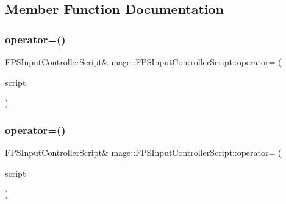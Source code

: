 \subsection{Member Function Documentation}
\hypertarget{classmage_1_1_f_p_s_input_controller_script_a226a1fb2eecbd7ecdf2033a8f5460e8b}{}\label{classmage_1_1_f_p_s_input_controller_script_a226a1fb2eecbd7ecdf2033a8f5460e8b} 
\subsubsection{\texorpdfstring{operator=()}{operator=()}\hspace{0.1cm}{\footnotesize\ttfamily [1/2]}}
{\footnotesize\ttfamily \hyperlink{classmage_1_1_f_p_s_input_controller_script}{F\+P\+S\+Input\+Controller\+Script}\& mage\+::\+F\+P\+S\+Input\+Controller\+Script\+::operator= (\begin{DoxyParamCaption}\item[{const \hyperlink{classmage_1_1_f_p_s_input_controller_script}{F\+P\+S\+Input\+Controller\+Script} \&}]{script }\end{DoxyParamCaption})\hspace{0.3cm}{\ttfamily [delete]}}

\hypertarget{classmage_1_1_f_p_s_input_controller_script_adac34abea3d474bf8183c2555dde9034}{}\label{classmage_1_1_f_p_s_input_controller_script_adac34abea3d474bf8183c2555dde9034} 
\subsubsection{\texorpdfstring{operator=()}{operator=()}\hspace{0.1cm}{\footnotesize\ttfamily [2/2]}}
{\footnotesize\ttfamily \hyperlink{classmage_1_1_f_p_s_input_controller_script}{F\+P\+S\+Input\+Controller\+Script}\& mage\+::\+F\+P\+S\+Input\+Controller\+Script\+::operator= (\begin{DoxyParamCaption}\item[{\hyperlink{classmage_1_1_f_p_s_input_controller_script}{F\+P\+S\+Input\+Controller\+Script} \&\&}]{script }\end{DoxyParamCaption})\hspace{0.3cm}{\ttfamily [delete]}}


